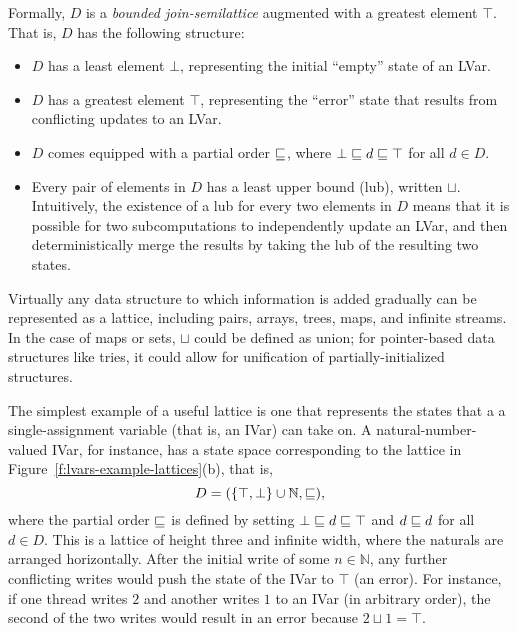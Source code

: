 Formally, $D$ is a \emph{bounded join-semilattice} augmented with a
greatest element $\top$.  That is, $D$ has the following structure:
\begin{itemize}
\item $D$ has a least element $\bot$, representing the initial
  ``empty'' state of an LVar.
\item $D$ has a greatest element $\top$, representing the ``error''
  state that results from conflicting updates to an LVar.
\item $D$ comes equipped with a partial order $\sqsubseteq$, where $\bot
  \sqsubseteq d \sqsubseteq \top$ for all $d \in D$.
\item Every pair of elements in $D$ has a least upper bound (lub),
  written $\sqcup$.  Intuitively, the existence of a lub for every two
  elements in $D$ means that it is possible for two subcomputations to
  independently update an LVar, and then deterministically merge the
  results by taking the lub of the resulting two states.
\end{itemize}

Virtually any data structure to which information is added gradually
can be represented as a lattice, including pairs, arrays, trees, maps,
and infinite streams.  In the case of maps or sets, $\sqcup$ could be
defined as union; for pointer-based data structures like tries, it
could allow for unification of partially-initialized structures.


The simplest example of a useful lattice is one that represents the
states that a a single-assignment variable (that is, an IVar) can take
on.  A natural-number-valued IVar, for instance, has a state space
corresponding to the lattice in
Figure~\ref{f:lvars-example-lattices}(b), that is,
\begin{displaymath}
  D = (\lbrace \top, \bot \rbrace \cup \mathbb{N}, \sqsubseteq), 
\end{displaymath}
where the partial order $\sqsubseteq$ is defined by setting $\bot
\sqsubseteq d \sqsubseteq \top$ and $d \sqsubseteq d$ for all $d \in D$.  This
is a lattice of height three and infinite width, where the naturals
are arranged horizontally.  After the initial write of some $n \in
\mathbb{N}$, any further conflicting writes would push the state of
the IVar to $\top$ (an error).  For instance, if one thread writes $2$
and another writes $1$ to an IVar (in arbitrary order), the second of
the two writes would result in an error because $2 \sqcup 1 = \top$.

